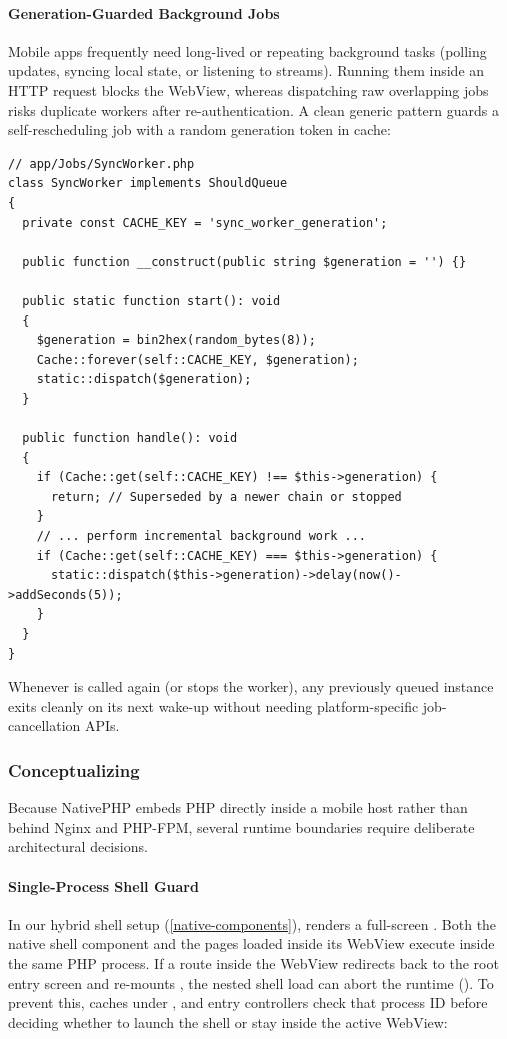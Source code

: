\paragraph{Generation-Guarded Background Jobs}
Mobile apps frequently need long-lived or repeating background tasks (polling updates, syncing
local state, or listening to streams). Running them inside an HTTP request blocks the WebView,
whereas dispatching raw overlapping jobs risks duplicate workers after re-authentication. A
clean generic pattern guards a self-rescheduling  job with a random generation
token in cache:

\begin{lstlisting}[language=php8]
// app/Jobs/SyncWorker.php
class SyncWorker implements ShouldQueue
{
  private const CACHE_KEY = 'sync_worker_generation';

  public function __construct(public string $generation = '') {}

  public static function start(): void
  {
    $generation = bin2hex(random_bytes(8));
    Cache::forever(self::CACHE_KEY, $generation);
    static::dispatch($generation);
  }

  public function handle(): void
  {
    if (Cache::get(self::CACHE_KEY) !== $this->generation) {
      return; // Superseded by a newer chain or stopped
    }
    // ... perform incremental background work ...
    if (Cache::get(self::CACHE_KEY) === $this->generation) {
      static::dispatch($this->generation)->delay(now()->addSeconds(5));
    }
  }
}
\end{lstlisting}

\noindent Whenever  is called again (or  stops
the worker), any previously queued instance exits cleanly on its next wake-up without needing
platform-specific job-cancellation APIs.


\subsubsection{Conceptualizing}

Because NativePHP embeds PHP directly inside a mobile host rather than behind Nginx and
PHP-FPM, several runtime boundaries require deliberate architectural decisions.

\paragraph{Single-Process Shell Guard}
In our hybrid shell setup (\cref{native-components}),  renders a full-screen
. Both the native shell component and the pages loaded inside its
WebView execute inside the same PHP process. If a route inside the WebView redirects back to the
root entry screen and re-mounts , the nested shell load can abort the runtime
(). To prevent this,  caches  under
, and entry controllers check that process ID before deciding
whether to launch the shell or stay inside the active WebView:

